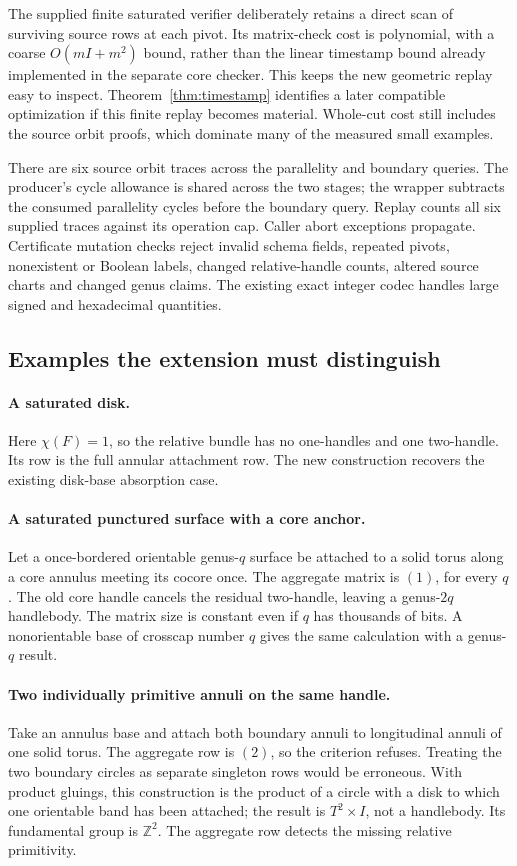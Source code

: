 The supplied finite saturated verifier deliberately retains a direct scan
of surviving source rows at each pivot. Its matrix-check cost is polynomial,
with a coarse $O(mI+m^2)$ bound, rather than the linear timestamp bound
already implemented in the separate core checker. This keeps the new
geometric replay easy to inspect. Theorem~\ref{thm:timestamp} identifies
a later compatible optimization if this finite replay becomes material.
Whole-cut cost still includes the source orbit proofs, which dominate
many of the measured small examples.

There are six source orbit traces across the parallelity and boundary
queries. The producer's cycle allowance is shared across the two stages;
the wrapper subtracts the consumed parallelity cycles before the boundary
query. Replay counts all six supplied traces against its operation cap.
Caller abort exceptions propagate. Certificate mutation checks reject
invalid schema fields, repeated pivots, nonexistent or Boolean labels,
changed relative-handle counts, altered source charts and changed genus
claims. The existing exact integer codec handles large signed and
hexadecimal quantities.

\subsection{Examples the extension must distinguish}

\paragraph{A saturated disk.}
Here $\chi(F)=1$, so the relative bundle has no one-handles and one
two-handle. Its row is the full annular attachment row. The new construction
recovers the existing disk-base absorption case.

\paragraph{A saturated punctured surface with a core anchor.}
Let a once-bordered orientable genus-$q$ surface be attached to a solid
torus along a core annulus meeting its cocore once. The aggregate matrix
is $(1)$, for every $q$. The old core handle cancels the residual two-handle,
leaving a genus-$2q$ handlebody. The matrix size is constant even if $q$
has thousands of bits. A nonorientable base of crosscap number $q$ gives
the same calculation with a genus-$q$ result.

\paragraph{Two individually primitive annuli on the same handle.}
Take an annulus base and attach both boundary annuli to longitudinal
annuli of one solid torus. The aggregate row is $(2)$, so the criterion
refuses. Treating the two boundary circles as separate singleton rows
would be erroneous. With product gluings, this construction is the product
of a circle with a disk to which one orientable band has been attached;
the result is $T^2\times I$, not a handlebody. Its fundamental group is
$\mathbb Z^2$. The aggregate row detects the missing relative primitivity.

